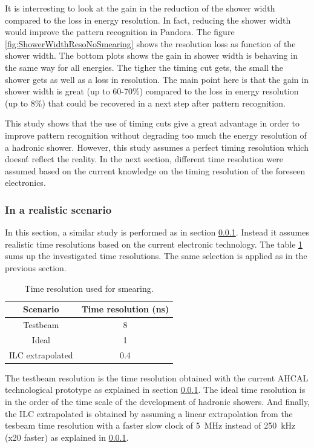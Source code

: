 It is interresting to look at the gain in the reduction of the shower width compared to the loss in energy resolution. In fact, reducing the shower width would improve the pattern recognition in Pandora. The figure \ref{fig:ShowerWidthResoNoSmearing} shows the resolution loss as function of the shower width. The bottom plots shows the gain in shower width is behaving in the same way for all energies. The tigher the timing cut gets, the small the shower gets as well as a loss in resolution. The main point here is that the gain in shower width is great (up to 60-70\%) compared to the loss in energy resolution (up to 8\%) that could be recovered in a next step after pattern recognition.

This study shows that the use of timing cuts give a great advantage in order to improve pattern recognition without degrading too much the energy resolution of a hadronic shower. However, this study assumes a perfect timing resolution which doesn\'t reflect the reality. In the next section, different time resolution were assumed based on the current knowledge on the timing resolution of the foreseen electronics.

\subsubsection{In a realistic scenario}

In this section, a similar study is performed as in section \ref{}. Instead it assumes realistic time resolutions based on the current electronic technology. The table \ref{table:TimeReso} sums up the investigated time resolutions. The same selection is applied as in the previous section.

\begin{table}[t]
  \centering
  \caption{Time resolution used for smearing.} \label{table:TimeReso}
  \begin{tabular}{|c|c|}
    \hline
    Scenario & Time resolution (ns) \\
    \hline
    Testbeam & 8 \\
    Ideal & 1 \\
    ILC extrapolated & 0.4 \\
    \hline
  \end{tabular}
\end{table}

The testbeam resolution is the time resolution obtained with the current AHCAL technological prototype as explained in section \ref{}. The ideal time resolution is in the order of the time scale of the development of hadronic showers. And finally, the ILC extrapolated is obtained by assuming a linear extrapolation from the tesbeam time resolution with a faster slow clock of \SI{5}{\mega\hertz} instead of \SI{250}{\kilo\hertz} (x20 faster) as explained in \ref{}.\\

